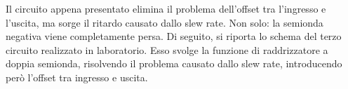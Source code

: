Il circuito appena presentato elimina il problema dell'offset tra l'ingresso e l'uscita, ma sorge il ritardo causato dallo slew rate. Non solo: la semionda negativa viene completamente persa. Di seguito, si riporta lo schema del terzo circuito realizzato in laboratorio. Esso svolge la funzione di raddrizzatore a doppia semionda, risolvendo il problema causato dallo slew rate, introducendo però l'offset tra ingresso e uscita.


